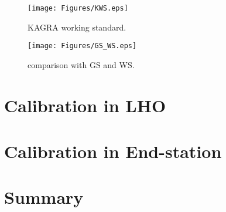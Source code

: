 \begin{figure}
\begin{center}
\texttt{[image: Figures/KWS.eps]}
\caption{KAGRA working standard.} 
\label{fig:KWS} 
\end{center}
\end{figure}

\begin{figure}
\begin{center}
\texttt{[image: Figures/GS\_WS.eps]}
\caption{comparison with GS and WS.} 
\label{fig:GS_WS} 
\end{center}
\end{figure}

\section{Calibration in LHO}
\section{Calibration in End-station}
\section{Summary}








